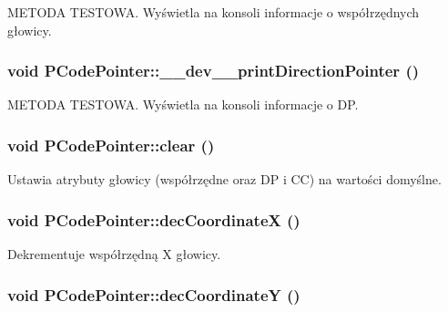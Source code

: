 METODA TESTOWA. Wyświetla na konsoli informacje o współrzędnych głowicy. \hypertarget{classPCodePointer_103c79ebd3257261d5c72322bc4eb742}{
\subsubsection[{\_\-\_\-dev\_\-\_\-printDirectionPointer}]{\setlength{\rightskip}{0pt plus 5cm}void PCodePointer::\_\-\_\-dev\_\-\_\-printDirectionPointer ()}}
\label{classPCodePointer_103c79ebd3257261d5c72322bc4eb742}


METODA TESTOWA. Wyświetla na konsoli informacje o DP. \hypertarget{classPCodePointer_fb47282905de53ad98a0c3d76dbd0fb0}{
\subsubsection[{clear}]{\setlength{\rightskip}{0pt plus 5cm}void PCodePointer::clear ()}}
\label{classPCodePointer_fb47282905de53ad98a0c3d76dbd0fb0}


Ustawia atrybuty głowicy (współrzędne oraz DP i CC) na wartości domyślne. \hypertarget{classPCodePointer_3b98e9637236aa9d975dc59c0397e625}{
\subsubsection[{decCoordinateX}]{\setlength{\rightskip}{0pt plus 5cm}void PCodePointer::decCoordinateX ()}}
\label{classPCodePointer_3b98e9637236aa9d975dc59c0397e625}


Dekrementuje współrzędną X głowicy. \hypertarget{classPCodePointer_cc8b95bb3786748c1aff41eed6d299e1}{
\subsubsection[{decCoordinateY}]{\setlength{\rightskip}{0pt plus 5cm}void PCodePointer::decCoordinateY ()}}
\label{classPCodePointer_cc8b95bb3786748c1aff41eed6d299e1}


